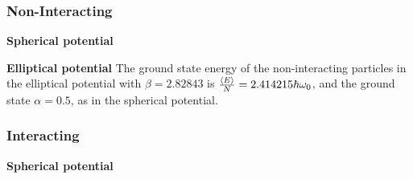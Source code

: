 \subsubsection{Non-Interacting}

\textbf{Spherical potential}


\textbf{Elliptical potential}
The ground state energy of the non-interacting particles in the elliptical potential with $\beta=2.82843$ is $\frac{\expval{E}}{N}=2.414215\hbar\omega_0$, and the ground state $\alpha=0.5$, as in the spherical potential. 



\subsubsection{Interacting}

\textbf{Spherical potential}

